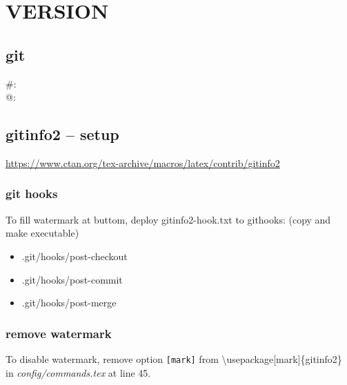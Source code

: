     \section{VERSION}
    \subsection{git}
    \#: \gitAbbrevHash\\
    @: \gitAuthorIsoDate\\
    \gitReferences
    \subsection{gitinfo2 -- setup}
    \url{https://www.ctan.org/tex-archive/macros/latex/contrib/gitinfo2}
    \subsubsection{git hooks}
    To fill watermark at buttom, deploy gitinfo2-hook.txt to githooks: (copy and make executable)
    \begin{itemize}
        \item .git/hooks/post-checkout
        \item .git/hooks/post-commit
        \item .git/hooks/post-merge
    \end{itemize}
    \subsubsection{remove watermark}
    To disable watermark, remove option \texttt{[mark]} from \textbackslash usepackage[mark]\{gitinfo2\} in \textit{config/commands.tex} at line 45.
